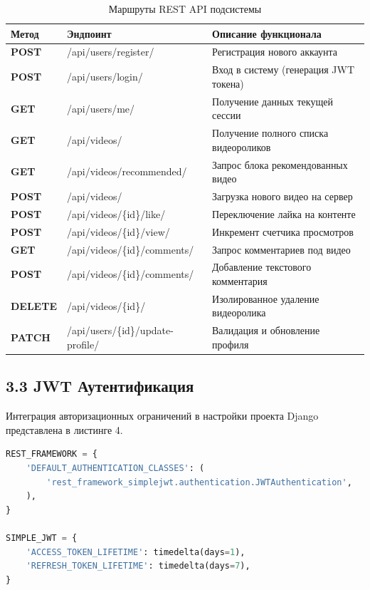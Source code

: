 \documentclass[a4paper,14pt,oneside,openany]{memoir}
\begin{document}
\begin{table}[H]
\centering
\small
\caption{Маршруты REST API подсистемы}
\begin{tabular}{|l|l|l|}
\hline
\textbf{Метод} & \textbf{Эндпоинт} & \textbf{Описание функционала} \\ \hline
\textbf{POST} & /api/users/register/ & Регистрация нового аккаунта \\ \hline
\textbf{POST} & /api/users/login/ & Вход в систему (генерация JWT токена) \\ \hline
\textbf{GET} & /api/users/me/ & Получение данных текущей сессии \\ \hline
\textbf{GET} & /api/videos/ & Получение полного списка видеороликов \\ \hline
\textbf{GET} & /api/videos/recommended/ & Запрос блока рекомендованных видео \\ \hline
\textbf{POST} & /api/videos/ & Загрузка нового видео на сервер \\ \hline
\textbf{POST} & /api/videos/\{id\}/like/ & Переключение лайка на контенте \\ \hline
\textbf{POST} & /api/videos/\{id\}/view/ & Инкремент счетчика просмотров \\ \hline
\textbf{GET} & /api/videos/\{id\}/comments/ & Запрос комментариев под видео \\ \hline
\textbf{POST} & /api/videos/\{id\}/comments/ & Добавление текстового комментария \\ \hline
\textbf{DELETE} & /api/videos/\{id\}/ & Изолированное удаление видеоролика \\ \hline
\textbf{PATCH} & /api/users/\{id\}/update-profile/ & Валидация и обновление профиля \\ \hline
\end{tabular}
\end{table}

\subsection{3.3 JWT Аутентификация}
Интеграция авторизационных ограничений в настройки проекта Django представлена в листинге 4.

\begin{lstlisting}[language=Python, caption={Настройка JWT в файле settings.py}]
REST_FRAMEWORK = {
    'DEFAULT_AUTHENTICATION_CLASSES': (
        'rest_framework_simplejwt.authentication.JWTAuthentication',
    ),
}

SIMPLE_JWT = {
    'ACCESS_TOKEN_LIFETIME': timedelta(days=1),
    'REFRESH_TOKEN_LIFETIME': timedelta(days=7),
}
\end{lstlisting}
\end{document}
